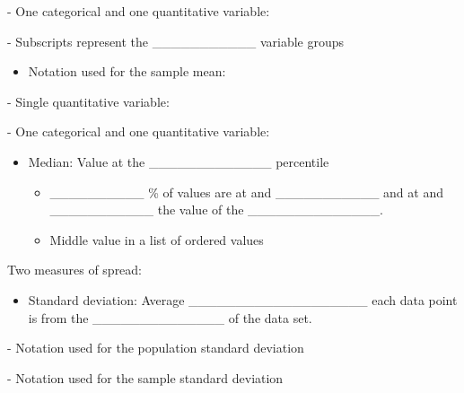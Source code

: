 \documentclass[
]{report}
\providecommand{\tightlist}{%
  \setlength{\itemsep}{0pt}\setlength{\parskip}{0pt}}
\newcommand{\rgi}{\hspace{24pt}}  %
\begin{document}
\vspace{0.1in}

\rgi \rgi - One categorical and one quantitative variable:

\vspace{0.1in}

\rgi \rgi \rgi - Subscripts represent the \_\_\_\_\_\_\_\_\_\_\_ variable groups

\begin{itemize}
\tightlist
\item
  Notation used for the sample mean:
\end{itemize}

\rgi \rgi - Single quantitative variable:

\vspace{0.1in}

\rgi \rgi - One categorical and one quantitative variable:

\vspace{0.1in}

\begin{itemize}
\item
  Median: Value at the \_\_\_\_\_\_\_\_\_\_\_\_\_ percentile

  \begin{itemize}
  \item
    \_\_\_\_\_\_\_\_\_\_ \% of values are at and \_\_\_\_\_\_\_\_\_\_\_ and at and \_\_\_\_\_\_\_\_\_\_\_ the value of the \_\_\_\_\_\_\_\_\_\_\_\_\_\_.
  \item
    Middle value in a list of ordered values
  \end{itemize}
\end{itemize}

Two measures of spread:

\begin{itemize}
\tightlist
\item
  Standard deviation: Average \_\_\_\_\_\_\_\_\_\_\_\_\_\_\_\_\_\_\_ each data point is from the \_\_\_\_\_\_\_\_\_\_\_\_\_\_ of the data set.
\end{itemize}

\vspace{1mm}

\rgi \rgi - Notation used for the population standard deviation

\vspace{0.2in}

\rgi \rgi - Notation used for the sample standard deviation

\vspace{0.2in}
\end{document}
